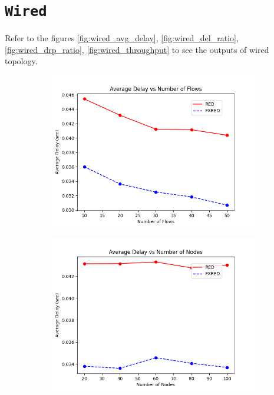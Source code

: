 \documentclass[10pt]{report}
\begin{document}
\section*{\textbf{\texttt{Wired}}}
Refer to the figures \ref{fig:wired_avg_delay}, \ref{fig:wired_del_ratio}, \ref{fig:wired_drp_ratio}, \ref{fig:wired_throughput} to see the outputs of wired topology.
\begin{figure}
    \centering
    \begin{subfigure}{.5\textwidth}
        \includegraphics[width=1\linewidth]{static/graphs/wired/Average Delay vs Number of Flows.png}
    \end{subfigure}%
    \begin{subfigure}{.5\textwidth}
        \includegraphics[width=1\linewidth]{static/graphs/wired/Average Delay vs Number of Nodes.png}
    \end{subfigure}


\end{figure}
\end{document}
